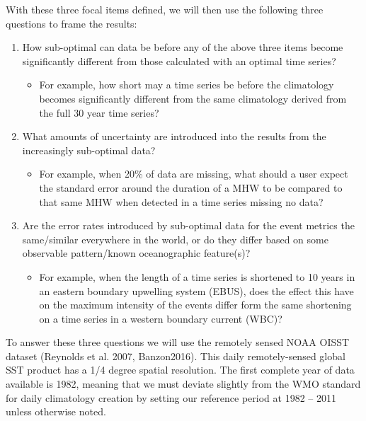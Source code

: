 \documentclass[utf8]{frontiersSCNS} %
\begin{document}
With these three focal items defined, we will then use the following
three questions to frame the results:

\begin{enumerate}
\def\labelenumi{\arabic{enumi})}
\tightlist
\item
  How sub-optimal can data be before any of the above three items become
  significantly different from those calculated with an optimal time
  series?

  \begin{itemize}
  \tightlist
  \item
    For example, how short may a time series be before the climatology
    becomes significantly different from the same climatology derived
    from the full 30 year time series?
  \end{itemize}
\item
  What amounts of uncertainty are introduced into the results from the
  increasingly sub-optimal data?

  \begin{itemize}
  \tightlist
  \item
    For example, when 20\% of data are missing, what should a user
    expect the standard error around the duration of a MHW to be
    compared to that same MHW when detected in a time series missing no
    data?
  \end{itemize}
\item
  Are the error rates introduced by sub-optimal data for the event
  metrics the same/similar everywhere in the world, or do they differ
  based on some observable pattern/known oceanographic feature(s)?

  \begin{itemize}
  \tightlist
  \item
    For example, when the length of a time series is shortened to 10
    years in an eastern boundary upwelling system (EBUS), does the
    effect this have on the maximum intensity of the events differ form
    the same shortening on a time series in a western boundary current
    (WBC)?
  \end{itemize}
\end{enumerate}

To answer these three questions we will use the remotely sensed NOAA
OISST dataset (Reynolds et al. 2007, Banzon2016). This daily
remotely-sensed global SST product has a 1/4 degree spatial resolution.
The first complete year of data available is 1982, meaning that we must
deviate slightly from the WMO standard for daily climatology creation by
setting our reference period at 1982 -- 2011 unless otherwise noted.
\end{document}

